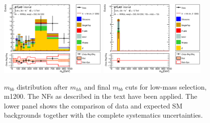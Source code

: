 \begin{figure}
\begin{center}
\includegraphics*[width=0.47\textwidth] {figures/Unblinded_mbb/C_reOpt700_mww_bbpt210_wwpt250_hh1200_bbMass_regionA_met25d020.eps}
\includegraphics*[width=0.47\textwidth] {figures/Unblinded_mbb/C_reOpt700_mww_bbpt210_wwpt250_hh1200_mbb_bbMass_regionA_met25d020.eps}
\caption[$m_{bb}$ distribution after $m_{hh}$ and final $m_{bb}$ cuts for low-mass selection, m1200.]{$m_{bb}$ distribution after $m_{hh}$ and final $m_{bb}$ cuts for low-mass selection, m1200. The NFs as described in the text have been applied. The lower panel shows the comparison of data and expected SM backgrounds together with the complete systematics uncertainties.}
\end{center}
\end{figure}

